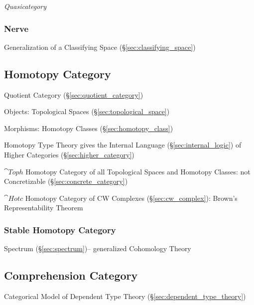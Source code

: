\emph{Quasicategory}



\subsubsection{Nerve}\label{sec:nerve}

Generalization of a Classifying Space (\S\ref{sec:classifying_space})



\subsection{Homotopy Category}\label{sec:homotopy_category}

Quotient Category (\S\ref{sec:quotient_category})

Objects: Topological Spaces (\S\ref{sec:topological_space})

Morphisms: Homotopy Classes (\S\ref{sec:homotopy_class})

Homotopy Type Theory gives the Internal Language
(\S\ref{sec:internal_logic}) of Higher Categories
(\S\ref{sec:higher_category})

$\cat{Toph}$ Homotopy Category of all Topological Spaces and Homotopy
Classes: not Concretizable (\S\ref{sec:concrete_category})

$\cat{Hotc}$ Homotopy Category of CW Complexes
(\S\ref{sec:cw_complex}): Brown's Representability Theorem



\subsubsection{Stable Homotopy Category}\label{sec:stable_homotopy_category}

Spectrum (\S\ref{sec:spectrum})-- generalized Cohomology Theory



\subsection{Comprehension Category}\label{sec:comprehension_category}

Categorical Model of Dependent Type Theory
(\S\ref{sec:dependent_type_theory})

